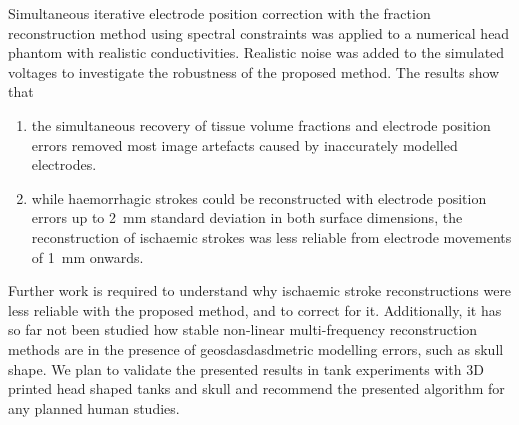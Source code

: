 Simultaneous iterative electrode position correction with the fraction reconstruction method using spectral constraints was applied to a numerical head phantom with realistic conductivities. Realistic noise was added to the simulated voltages to investigate the robustness of the proposed method. The results show that

\begin{enumerate}
\item the simultaneous recovery of tissue volume fractions and electrode position errors removed most image artefacts caused by inaccurately modelled electrodes.
\item while haemorrhagic strokes could be reconstructed with electrode position errors up to \SI{2}{\milli\metre} standard deviation in both surface dimensions, the reconstruction of ischaemic strokes was less reliable from electrode movements of \SI{1}{\milli\metre} onwards.
\end{enumerate}

Further work is required to understand why ischaemic stroke reconstructions were less reliable with the proposed method, and to correct for it. Additionally, it has so far not been studied how stable non-linear multi-frequency reconstruction methods are in the presence of geosdasdasdmetric modelling errors, such as skull shape. We plan to validate the presented results in tank experiments with 3D printed head shaped tanks and skull \citep{Jehl2015b} and recommend the presented algorithm for any planned human studies.